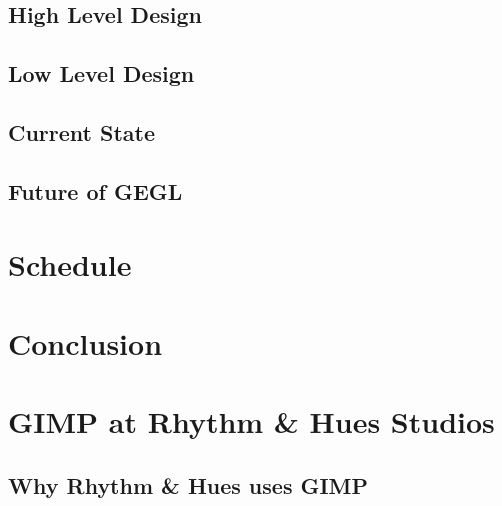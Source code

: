 \documentclass{report}
\begin{document}
\section{High Level Design}
\label{sec:High_Level_Design}


\section{Low Level Design}
\label{sec:Low_Level_Design}


\section{Current State}
\label{sec:Current_State}


\section{Future of GEGL}
\label{sec:Future_of_GEGL}


\chapter{Schedule}
\label{ch:Schedule}


\chapter{Conclusion}
\label{ch:Conclusion}



\appendix

\chapter{GIMP at Rhythm \& Hues Studios}
\label{ch:GIMP_at_Rhythm_Hues}


\section{Why Rhythm \& Hues uses GIMP}
\label{sec:Why_Rhythm_Hues_uses_GIMP}

\end{document}
